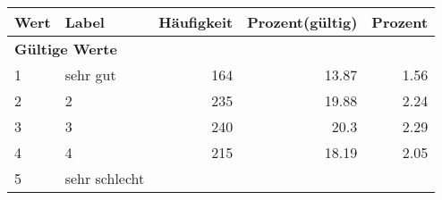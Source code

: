      \begin{longtable}{lXrrr}
     \toprule
     \textbf{Wert} & \textbf{Label} & \textbf{Häufigkeit} & \textbf{Prozent(gültig)} & \textbf{Prozent} \\
     \endhead
     \midrule
     \multicolumn{5}{l}{\textbf{Gültige Werte}}\\

     1 &
     \multicolumn{1}{X}{ sehr gut   } &


       \num{164} &
       \num[round-mode=places,round-precision=2]{13.87} &
         \num[round-mode=places,round-precision=2]{1.56} \\

     2 &
     \multicolumn{1}{X}{ 2   } &


       \num{235} &
       \num[round-mode=places,round-precision=2]{19.88} &
         \num[round-mode=places,round-precision=2]{2.24} \\

     3 &
     \multicolumn{1}{X}{ 3   } &


       \num{240} &
       \num[round-mode=places,round-precision=2]{20.3} &
         \num[round-mode=places,round-precision=2]{2.29} \\

     4 &
     \multicolumn{1}{X}{ 4   } &


       \num{215} &
       \num[round-mode=places,round-precision=2]{18.19} &
         \num[round-mode=places,round-precision=2]{2.05} \\

     5 &
     \multicolumn{1}{X}{ sehr schlecht   } &



\end{longtable}
